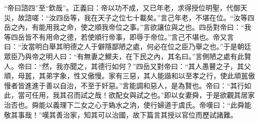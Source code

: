 {\noindent\shu{}\fzkt “帝曰諮四”至“欽哉”。正義曰：帝以功不成，又已年老，求得授位明聖，代御天災，故諮嗟：“汝四岳等，我在天子之位七十載矣。”言己年老，不堪在位。“汝等四岳之內，有能用我之命，使之順我帝位之事。”言欲讓位與之也。四岳對帝曰：“我等四岳皆不有用命之德，若使順行帝事，即辱于帝位。”言己不堪也。帝又言曰：“汝當明白舉其明德之人于僻隱鄙陋之處，何必在位之臣乃舉之也。”于是朝廷眾臣乃與帝之明人曰：“有無妻之鰥夫，在下民之內，其名曰。”言側陋之處有此賢人。帝曰：“然，我亦聞之，其德行如何？”四岳又對帝曰：“其人愚瞽之子，其父頑，母嚚，其弟字象，性又傲慢。家有三惡，其人能諧和以至孝之行，使此頑嚚傲慢者皆進進于善以自治，不至于奸惡。”言能調和惡人，是為賢也。帝曰：“其行如此，當可任用，我其召而試之哉！欲配女與試之也。”即以女妻舜，于是欲觀其居家治否也。舜能以義理下二女之心于媯水之汭，使行婦道于虞氏。帝嘆曰：“此舜能敬其事哉！”嘆其善治家，知其可以治國，故下篇言其授以官位而歷試諸難。 \par}


